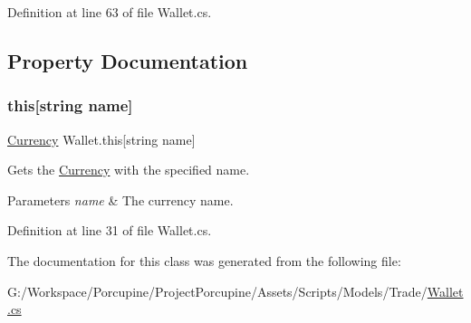 Definition at line 63 of file Wallet.\+cs.



\subsection{Property Documentation}
\mbox{\label{class_wallet_a7a0b160460a0749074db2943feda130e}} 
\subsubsection{\texorpdfstring{this[string name]}{this[string name]}}
{\footnotesize\ttfamily \hyperlink{class_currency}{Currency} Wallet.\+this\mbox{[}string name\mbox{]}\hspace{0.3cm}{\ttfamily [get]}}



Gets the \hyperlink{class_currency}{Currency} with the specified name. 


\begin{DoxyParams}{Parameters}
{\em name} & The currency name.\\
\hline
\end{DoxyParams}


Definition at line 31 of file Wallet.\+cs.



The documentation for this class was generated from the following file\+:\begin{DoxyCompactItemize}
\item 
G\+:/\+Workspace/\+Porcupine/\+Project\+Porcupine/\+Assets/\+Scripts/\+Models/\+Trade/\hyperlink{_wallet_8cs}{Wallet.\+cs}\end{DoxyCompactItemize}
